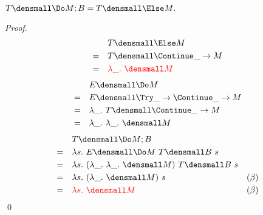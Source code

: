 \begin{lemma}
  \label{thm:template-commit}
  $ T\den{\Do M; B} = T\den{\Else M}.$
\end{lemma}
    \begin{proof}
        \begin{align*}
            &\quad T\den{\Else M} \\
            =&\quad T\den{\Continue \_ \to M} \\
            =&\quad \color{red}{\lambda \_. ~\den{M}} \\
        \end{align*}
        \begin{align*}
            &\quad E\den{\Do M} \\
            =&\quad E\den{\Try \_ \to \Continue \_ \to M} \\
            =& \quad \lambda \_. ~T\den{\Continue \_ \to M} \\
            =& \quad \lambda \_. ~\lambda \_. ~  \den{M}  
        \end{align*}
        \begin{align*}
            &\quad T\den{\Do M; B} \\
            =& \quad \lambda s. ~ E\den{\Do M} ~T\den{B} ~s \\
            =& \quad \lambda s. ~ (\lambda \_. ~\lambda \_. ~  \den{M}) ~T\den{B} ~s \\
            =& \quad \lambda s. ~ (\lambda \_. ~  \den{M}) ~s  & (\beta)\\
            =& \quad \color{red}{\lambda s. ~ \den{M}}  & (\beta)
        \end{align*}
        \qed
    \end{proof}

